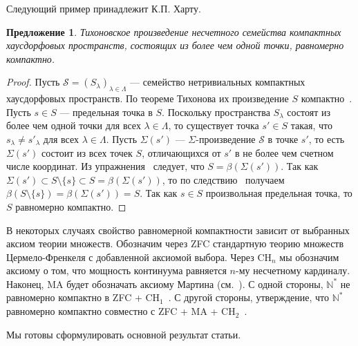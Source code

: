 \documentclass[12pt]{article}
\newtheorem{proposition}[theorem]{Предложение}
\begin{document}
Следующий пример принадлежит К.П. Харту.

\begin{proposition}\label{UcountProdCompSpIsUnifComp} Тихоновское произведение
    несчетного семейства компактных хаусдорфовых пространств, состоящих из более
    чем одной точки, равномерно компактно.
\end{proposition}
\begin{proof} Пусть $\mathcal{S}={(S_\lambda)}_{\lambda\in\Lambda}$ ---
    семейство нетривиальных компактных хаусдорфовых пространств. По теореме
    Тихонова их произведение $S$ компактно~\cite[теорема 3.2.4]{EngkingGenTop}.
    Пусть $s\in S$ --- предельная точка в $S$. Поскольку пространства
    $S_\lambda$ состоят из более чем одной точки для всех $\lambda\in\Lambda$,
    то существует точка $s'\in S$ такая, что $s_\lambda\neq s'_\lambda$ для всех
    $\lambda\in\Lambda$. Пусть $\Sigma(s')$ --- $\Sigma$-произведение
    $\mathcal{S}$ в точке $s'$, то есть $\Sigma(s')$ состоит из всех точек $S$,
    отличающихся от $s'$ в не более чем счетном числе координат. Из
    упражнения~\cite[упражнение 3.12.23(c)]{EngkingGenTop} следует, что
    $S=\beta(\Sigma(s'))$. Так как 
    $\Sigma(s')\subset S\setminus \{s\}\subset S=\beta(\Sigma(s'))$, 
    то по следствию~\cite[следствие 3.6.9]{EngkingGenTop}
    получаем $\beta(S\setminus \{s\})=\beta(\Sigma(s'))=S$. Так как $s\in S$
    произвольная предельная точка, то $S$ равномерно компактно.
\end{proof}

В некоторых случаях свойство равномерной компактности зависит от выбранных
аксиом теории множеств. Обозначим через \textsc{ZFC} стандартную теорию множеств
Цермело-Френкеля с добавленной аксиомой выбора. Через \textsc{CH}$_n$ мы
обозначим аксиому о том, что мощность континуума равняется $n$-му несчетному
кардиналу. Наконец, \textsc{MA} будет обозначать аксиому Мартина
(см.~\cite{KunSetThIndepPrf}). С одной стороны, $\mathbb{N}^*$ не равномерно
компактно в \textsc{ZFC + CH$_1$}~\cite{FinGillExtContFuncbN}. С другой стороны,
утверждение, что $\mathbb{N}^*$ равномерно компактно совместно с \textsc{ZFC +
    MA + CH$_2$}~\cite{DouKunMillCStarEmbdDenPropSbspStoneRemN}.

Мы готовы сформулировать основной результат статьи.
\end{document}
